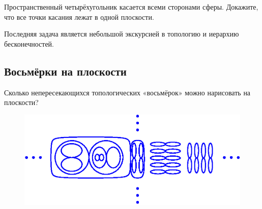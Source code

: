 Пространственный четырёхугольник касается всеми сторонами сферы.
Докажите, что все точки касания лежат в одной плоскости.

\medskip

Последняя задача является небольшой экскурсией в топологию и иерархию бесконечностей.

\subsection*{Восьмёрки на плоскости}%

Сколько непересекающихся топологических «восьмёрок» можно нарисовать на плоскости?

\begin{figure}[h!]
\centering
\includegraphics[scale=0.5]{Figs/Geometry/eights}
\end{figure} 
